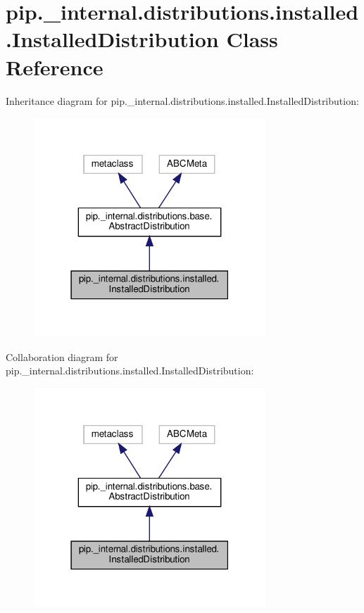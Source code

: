 \hypertarget{classpip_1_1__internal_1_1distributions_1_1installed_1_1InstalledDistribution}{}\section{pip.\+\_\+internal.\+distributions.\+installed.\+Installed\+Distribution Class Reference}
\label{classpip_1_1__internal_1_1distributions_1_1installed_1_1InstalledDistribution}


Inheritance diagram for pip.\+\_\+internal.\+distributions.\+installed.\+Installed\+Distribution\+:
\nopagebreak
\begin{figure}[H]
\begin{center}
\leavevmode
\includegraphics[width=247pt]{classpip_1_1__internal_1_1distributions_1_1installed_1_1InstalledDistribution__inherit__graph}
\end{center}
\end{figure}


Collaboration diagram for pip.\+\_\+internal.\+distributions.\+installed.\+Installed\+Distribution\+:
\nopagebreak
\begin{figure}[H]
\begin{center}
\leavevmode
\includegraphics[width=247pt]{classpip_1_1__internal_1_1distributions_1_1installed_1_1InstalledDistribution__coll__graph}
\end{center}
\end{figure}
